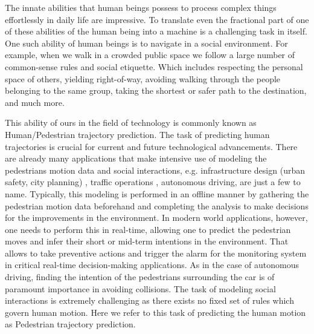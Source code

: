 The innate abilities that human beings possess to process complex things effortlessly in daily life are impressive. To translate even the fractional part of one of these abilities of the human being into a machine is a challenging task in itself. One such ability of human beings is to navigate in a social environment. For example, when we walk in a crowded public space we follow a large number of common-sense rules and social etiquette. Which includes respecting the personal space of others, yielding right-of-way, avoiding walking through the people belonging to the same group, taking the shortest or safer path to the destination, and much more.


This ability of ours in the field of technology is commonly known as Human/Pedestrian trajectory prediction. The task of predicting human trajectories is crucial for current and future technological advancements. There are already many applications that make intensive use of modeling the pedestrians motion data and social interactions, e.g. infrastructure design (urban safety, city planning) \cite{Hanisch2003OnlineSO, Lerner2007CrowdsBE, Bitgood2006AnAO}, traffic operations \cite{Horni2016TheMT}, autonomous driving, are just a few to name. Typically, this modeling is performed in an offline manner by gathering the pedestrian motion data beforehand and completing the analysis to make decisions for the improvements in the environment. In modern world applications, however, one needs to perform this in real-time, allowing one to predict the pedestrian moves and infer their short or mid-term intentions in the environment. That allows to take preventive actions and trigger the alarm for the monitoring system in critical real-time decision-making applications. As in the case of autonomous driving, finding the intention of the pedestrians surrounding the car is of paramount importance in avoiding collisions. The task of modeling social interactions is extremely challenging as there exists no fixed set of rules which govern human motion. Here we refer to this task of predicting the human motion as Pedestrian trajectory prediction.


